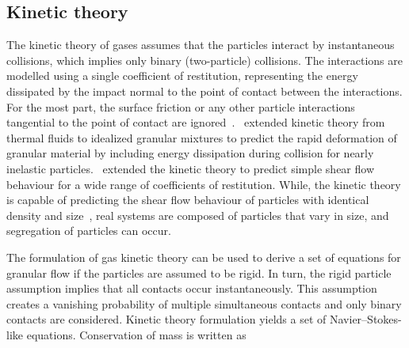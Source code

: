 \subsection{Kinetic theory}
The kinetic theory of gases assumes that the particles interact by 
instantaneous collisions, which implies only binary (two-particle) collisions. 
The interactions are modelled using a single coefficient of restitution, 
representing the energy dissipated by the impact normal to the point of contact 
between the interactions. For the most part, the surface friction or any other 
particle interactions tangential to the point of contact are 
ignored~\citep{Campbell1990}.~\citet{Jenkins1983} extended kinetic theory 
from thermal fluids to idealized granular mixtures to predict the rapid 
deformation of granular material by including energy dissipation during 
collision for nearly inelastic particles.~\citet{Savage1981} extended the 
kinetic theory to predict simple shear flow behaviour for a wide range of 
coefficients of restitution. While, the kinetic theory is capable of predicting 
the shear flow behaviour of particles with identical density and 
size~\citep{Iddir2005}, real systems are composed of particles that vary in 
size, and segregation of particles can occur. 

The formulation of gas kinetic theory can be used to derive a
set of equations for granular flow if the particles are assumed to
be rigid. In turn, the rigid particle assumption implies that all contacts 
occur instantaneously. This assumption creates a vanishing probability of 
multiple simultaneous contacts and only binary contacts are considered. Kinetic 
theory formulation yields a set of Navier–Stokes-like 
equations. 
Conservation of mass is written as

